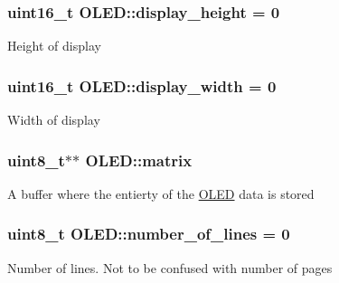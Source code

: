 \subsubsection[{\texorpdfstring{display\+\_\+height}{display_height}}]{\setlength{\rightskip}{0pt plus 5cm}uint16\+\_\+t O\+L\+E\+D\+::display\+\_\+height = 0\hspace{0.3cm}{\ttfamily [private]}}\hypertarget{class_o_l_e_d_aa14ebb59666d7822288115a04ac0a34b}{}\label{class_o_l_e_d_aa14ebb59666d7822288115a04ac0a34b}
Height of display 
\subsubsection[{\texorpdfstring{display\+\_\+width}{display_width}}]{\setlength{\rightskip}{0pt plus 5cm}uint16\+\_\+t O\+L\+E\+D\+::display\+\_\+width = 0\hspace{0.3cm}{\ttfamily [private]}}\hypertarget{class_o_l_e_d_ae88ab3d6d63a7ead982a3b7cc673eefe}{}\label{class_o_l_e_d_ae88ab3d6d63a7ead982a3b7cc673eefe}
Width of display 
\subsubsection[{\texorpdfstring{matrix}{matrix}}]{\setlength{\rightskip}{0pt plus 5cm}uint8\+\_\+t$\ast$$\ast$ O\+L\+E\+D\+::matrix\hspace{0.3cm}{\ttfamily [private]}}\hypertarget{class_o_l_e_d_a9d32e21189940afba24deab0a2bc0126}{}\label{class_o_l_e_d_a9d32e21189940afba24deab0a2bc0126}
A buffer where the entierty of the \hyperlink{class_o_l_e_d}{O\+L\+ED} data is stored 
\subsubsection[{\texorpdfstring{number\+\_\+of\+\_\+lines}{number_of_lines}}]{\setlength{\rightskip}{0pt plus 5cm}uint8\+\_\+t O\+L\+E\+D\+::number\+\_\+of\+\_\+lines = 0\hspace{0.3cm}{\ttfamily [private]}}\hypertarget{class_o_l_e_d_a9ea1c55112deede1a61142af276a6bc9}{}\label{class_o_l_e_d_a9ea1c55112deede1a61142af276a6bc9}
Number of lines. Not to be confused with number of pages 
